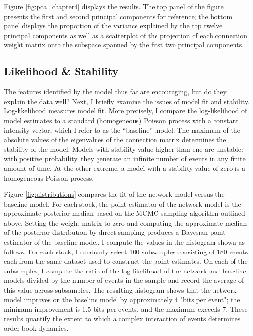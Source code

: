 Figure \ref{fig:pca_chapter4} displays the results. The top panel of the figure presents the first and second principal components for reference; the bottom panel displays the proportion of the variance explained by the top twelve principal components as well as a scatterplot of the projection of each connection weight matrix onto the subspace spanned by the first two principal components.

\subsection{Likelihood \& Stability}
The features identified by the model thus far are encouraging, but do they explain the data well? Next, I briefly examine the issues of model fit and stability. Log-likelihood measures model fit. More precisely, I compare the log-likelihood of model estimates to a standard (homogeneous) Poisson process with a constant intensity vector, which I refer to as the “baseline” model. The maximum of the absolute values of the eigenvalues of the connection matrix determines the stability of the model. Models with stability value higher than one are unstable: with positive probability, they generate an infinite number of events in any finite amount of time. At the other extreme, a model with a stability value of zero is a homogeneous Poisson process.

Figure \ref{fig:distributions} compares the fit of the network model versus the baseline model. For each stock, the point-estimator of the network model is the approximate posterior median based on the MCMC sampling algorithm outlined above. Setting the weight matrix to zero and computing the approximate median of the posterior distribution by direct sampling produces a Bayesian point-estimator of the baseline model. I compute the values in the histogram shown as follows. For each stock, I randomly select 100 subsamples consisting of 180 events each from the same dataset used to construct the point estimates. On each of the subsamples, I compute the ratio of the log-likelihood of the network and baseline models divided by the number of events in the sample and record the average of this value across subsamples. The resulting histogram shows that the network model improves on the baseline model by approximately 4 "bits per event"; the minimum improvement is 1.5 bits per events, and the maximum exceeds 7. These results quantify the extent to which a complex interaction of events determines order book dynamics.

